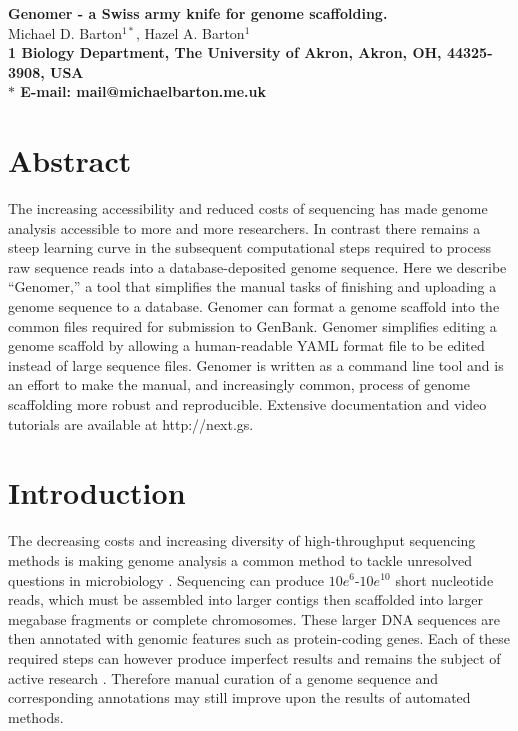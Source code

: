 \documentclass[10pt]{article}
\date{}
\begin{document}
\begin{flushleft}
{\Large
\textbf{Genomer - a Swiss army knife for genome scaffolding.}
}
\\
Michael D. Barton$^{1\ast}$, 
Hazel A. Barton$^{1}$
\\
\bf{1} Biology Department, The University of Akron, Akron, OH, 44325-3908, USA
\\
$\ast$ E-mail: mail@michaelbarton.me.uk
\end{flushleft}

\section*{Abstract}

The increasing accessibility and reduced costs of sequencing has made genome
analysis accessible to more and more researchers. In contrast there remains a
steep learning curve in the subsequent computational steps required to process
raw sequence reads into a database-deposited genome sequence. Here we describe
``Genomer,'' a tool that simplifies the manual tasks of finishing and uploading
a genome sequence to a database. Genomer can format a genome scaffold into the
common files required for submission to GenBank. Genomer simplifies editing a
genome scaffold by allowing a human-readable YAML format file to be edited
instead of large sequence files. Genomer is written as a command line tool and
is an effort to make the manual, and increasingly common, process of genome
scaffolding more robust and reproducible. Extensive documentation and video
tutorials are available at http://next.gs.

\section*{Introduction}

The decreasing costs and increasing diversity of high-throughput sequencing
methods is making genome analysis a common method to tackle unresolved
questions in microbiology \cite{loman2012b}. Sequencing can produce
$10e^{6}$-$10e^{10}$ short nucleotide reads, which must be assembled into
larger contigs then scaffolded into larger megabase fragments or complete
chromosomes. These larger DNA sequences are then annotated with genomic
features such as protein-coding genes. Each of these required steps can however
produce imperfect results and remains the subject of active research
\cite{earl2011,quail2012,beckloff2012}. Therefore manual curation of a genome
sequence and corresponding annotations may still improve upon the results of
automated methods.
\end{document}
